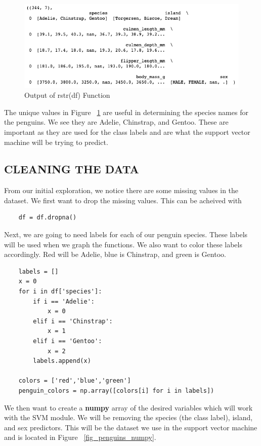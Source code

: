 \documentclass[12pt]{article}
\begin{document}
\begin{figure}[H]
    \centering
    \includegraphics[width=5in]{Figures/penguins/rstr(df).png}
    \caption{Output of rstr(df) Function}
    \label{fig_rstr(df)}
\end{figure}

The unique values in Figure ~\ref{fig_rstr(df)} are useful in determining the species names for the penguins. We see they are Adelie, Chinstrap, and Gentoo. These are important as they are used for the class labels and are what the support vector machine will be trying to predict.

\subsection{CLEANING THE DATA}

From our initial exploration, we notice there are some missing values in the dataset. We first want to drop the missing values. This can be acheived with

\begin{verbatim}
    df = df.dropna()
\end{verbatim}

Next, we are going to need labels for each of our penguin species. These labels will be used when we graph the functions. We also want to color these labels accordingly. Red will be Adelie, blue is Chinstrap, and green is Gentoo.

\begin{verbatim}
    labels = []
    x = 0
    for i in df['species']:
        if i == 'Adelie':
            x = 0
        elif i == 'Chinstrap':
            x = 1
        elif i == 'Gentoo':
            x = 2
        labels.append(x)
    
    colors = ['red','blue','green']
    penguin_colors = np.array([colors[i] for i in labels])
\end{verbatim}

We then want to create a \textbf{numpy} array of the desired variables which will work with the SVM module. We will be removing the species (the class label), island, and sex predictors. This will be the dataset we use in the support vector machine and is located in Figure ~\ref{fig_penguins_numpy}.
\end{document}
